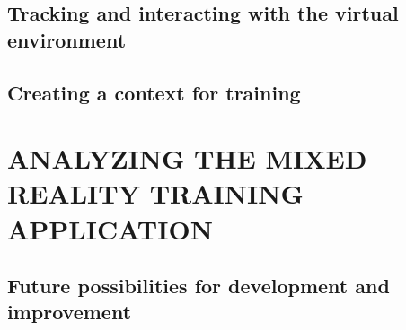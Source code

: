 \documentclass[12pt, a4paper,oneside, nocenter]{thesis}
\begin{document}
\section{Tracking and interacting with the virtual environment}
\section{Creating a context for training}

\par
\chapter{\MakeUppercase{Analyzing the mixed reality training application}}

\section{Future possibilities for development and improvement}


\newpage

\nocite{*}

\end{document}
